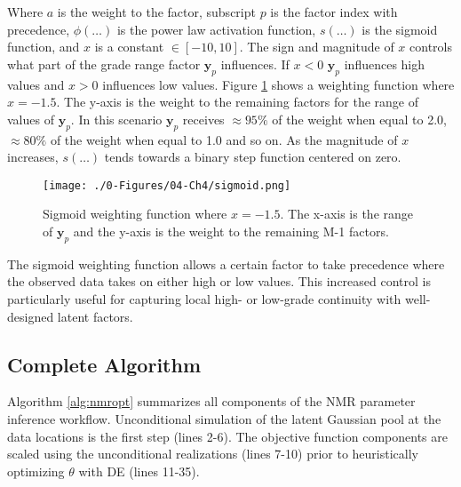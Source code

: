 Where $a$ is the weight to the factor, subscript $p$ is the factor index with precedence, $\phi(\dots)$ is the power law activation function, $s(\dots)$ is the sigmoid function, and $x$ is a constant $\in [-10, 10]$. The sign and magnitude of $x$ controls what part of the grade range factor $\mathbf{y}_{p}$ influences. If $x<0$ $\mathbf{y}_{p}$ influences high values and $x>0$ influences low values. Figure \ref{fig:sigmoid} shows a weighting function where $x=-1.5$. The y-axis is the weight to the remaining factors for the range of values of $\mathbf{y}_{p}$. In this scenario $\mathbf{y}_{p}$ receives $\approx 95\%$ of the weight when equal to 2.0, $\approx 80\%$ of the weight when equal to 1.0 and so on. As the magnitude of $x$ increases, $s(\dots)$ tends towards a binary step function centered on zero.

\begin{figure}[htb!]
    \centering
    \texttt{[image: ./0-Figures/04-Ch4/sigmoid.png]}
    \caption{Sigmoid weighting function where $x=-1.5$. The x-axis is the range of $\mathbf{y}_{p}$ and the y-axis is the weight to the remaining M-1 factors. }
    \label{fig:sigmoid}
\end{figure}

The sigmoid weighting function allows a certain factor to take precedence where the observed data takes on either high or low values. This increased control is particularly useful for capturing local high- or low-grade continuity with well-designed latent factors.

\subsection{Complete Algorithm}
\label{subsec:04algorithm}

Algorithm \ref{alg:nmropt} summarizes all components of the \gls{NMR} parameter inference workflow. Unconditional simulation of the latent Gaussian pool at the data locations is the first step (lines 2-6). The objective function components are scaled using the unconditional realizations (lines 7-10) prior to heuristically optimizing $\theta$ with \gls{DE} (lines 11-35).

